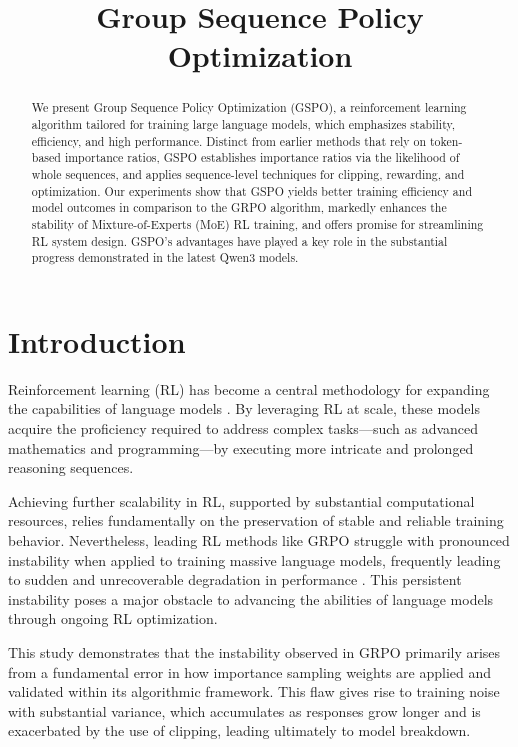 \title{Group Sequence Policy Optimization}

\begin{abstract}
We present Group Sequence Policy Optimization (GSPO), a reinforcement learning algorithm tailored for training large language models, which emphasizes stability, efficiency, and high performance. Distinct from earlier methods that rely on token-based importance ratios, GSPO establishes importance ratios via the likelihood of whole sequences, and applies sequence-level techniques for clipping, rewarding, and optimization. Our experiments show that GSPO yields better training efficiency and model outcomes in comparison to the GRPO algorithm, markedly enhances the stability of Mixture-of-Experts (MoE) RL training, and offers promise for streamlining RL system design. GSPO's advantages have played a key role in the substantial progress demonstrated in the latest Qwen3 models.
\end{abstract}

\section{Introduction}
\label{sec:intro}

Reinforcement learning (RL) has become a central methodology for expanding the capabilities of language models \citep{o1,dpsk-r1,qwq32b,qwen3}. By leveraging RL at scale, these models acquire the proficiency required to address complex tasks—such as advanced mathematics and programming—by executing more intricate and prolonged reasoning sequences.

Achieving further scalability in RL, supported by substantial computational resources, relies fundamentally on the preservation of stable and reliable training behavior. Nevertheless, leading RL methods like GRPO \citep{grpo} struggle with pronounced instability when applied to training massive language models, frequently leading to sudden and unrecoverable degradation in performance \citep{qwen3, minimax-m1}. This persistent instability poses a major obstacle to advancing the abilities of language models through ongoing RL optimization.

This study demonstrates that the instability observed in GRPO primarily arises from a fundamental error in how importance sampling weights are applied and validated within its algorithmic framework. This flaw gives rise to training noise with substantial variance, which accumulates as responses grow longer and is exacerbated by the use of clipping, leading ultimately to model breakdown.

